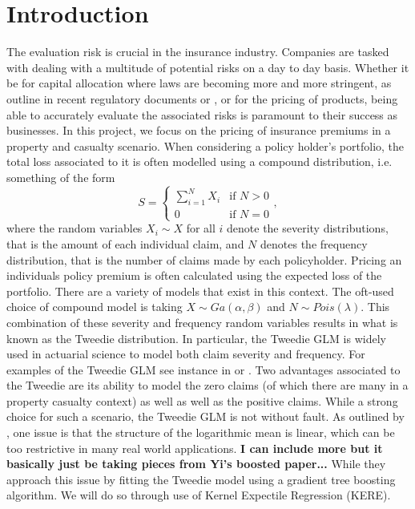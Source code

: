 \documentclass{article}
\numberwithin{equation}{section}
\begin{document}
\section{Introduction}
The evaluation risk is crucial in the insurance industry. Companies are tasked with dealing with a multitude of potential risks on a day to day basis. Whether it be for capital allocation where laws are becoming more and more stringent, as outline in recent regulatory documents   or \cite{OSFI2015}, or for the pricing of products, being able to accurately evaluate the associated risks is paramount to their success as businesses. In this project, we focus on the pricing of insurance premiums in a property and casualty scenario. When considering a policy holder's portfolio, the total loss associated to it is often modelled using a compound distribution, i.e. something of the form
$$
S=\left\{\begin{array}{ll}\sum_{i=1}^NX_i & \text{if }N>0\\0 & \text{if }N=0\end{array}\right.,
$$
where the random variables $X_i\sim X$ for all $i$ denote the severity distributions, that is the amount of each individual claim, and $N$ denotes the frequency distribution, that is the number of claims made by each policyholder. Pricing an individuals policy premium is often calculated using the expected loss of the portfolio. There are a variety of models that exist in this context. The oft-used choice of compound model is taking $X\sim Ga(\alpha,\beta)$ and $N\sim Pois(\lambda)$. This combination of these severity and frequency random variables results in what is known as the Tweedie distribution. In particular, the Tweedie GLM is widely used in actuarial science to model both claim severity and frequency. For examples of the Tweedie GLM see instance in \cite{murphy2000using} or \cite{peters2008model}. Two advantages associated to the Tweedie are its ability to model the zero claims (of which there are many in a property casualty context) as well as well as the positive claims.
While a strong choice for such a scenario, the Tweedie GLM is not without fault. As outlined by \cite{yang2016insurance}, one issue is that the structure of the logarithmic mean is linear, which can be too restrictive in many real world applications. \textbf{I can include more but it basically just be taking pieces from Yi's boosted paper...} While they approach this issue by fitting the Tweedie model using a gradient tree boosting algorithm. We will do so through use of Kernel Expectile Regression (KERE).


\end{document}
